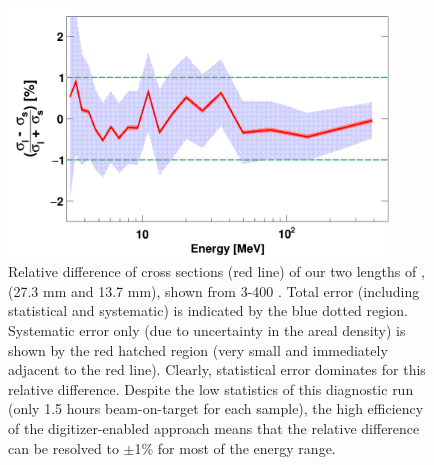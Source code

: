 \begin{figure}[tb]
    \centering
    \includegraphics[width=0.9\textwidth]{figures/relativeDiff_longCarbonShortCarbon.png}
    \caption[Neutron \tot\ relative difference between short and long \cNat\ samples]
    {
        Relative difference of cross sections (red line) of
        our two lengths of \cNat, (27.3 mm and 13.7 mm), shown from 3-400
        \mega\electronvolt. Total error
        (including statistical and systematic) is indicated by the blue
        dotted region. Systematic error only (due to uncertainty in the areal
        density) is shown by the red hatched region (very small and immediately adjacent to 
        the red line). Clearly, statistical error dominates for this relative
        difference.
        Despite the low statistics of this diagnostic run (only 1.5 hours
        beam-on-target for each sample), the high efficiency of the
        digitizer-enabled approach means that the relative difference can be resolved to 
        $\pm$1\% for most of the energy range.
    }

    \label{CarbonBenchmarking}
\end{figure}

